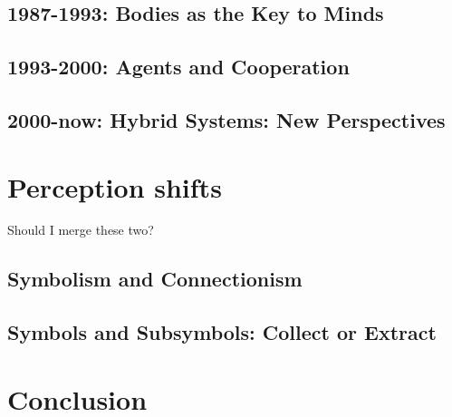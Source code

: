 \documentclass{article}
\begin{document}
\subsection{1987-1993: Bodies as the Key to Minds}


\subsection{1993-2000: Agents and Cooperation}


\subsection{2000-now: Hybrid Systems: New Perspectives}


\section{Perception shifts}
Should I merge these two?
\subsection{Symbolism and Connectionism}
\subsection{Symbols and Subsymbols: Collect or Extract}

\section{Conclusion}


\printbibliography
\end{document}
